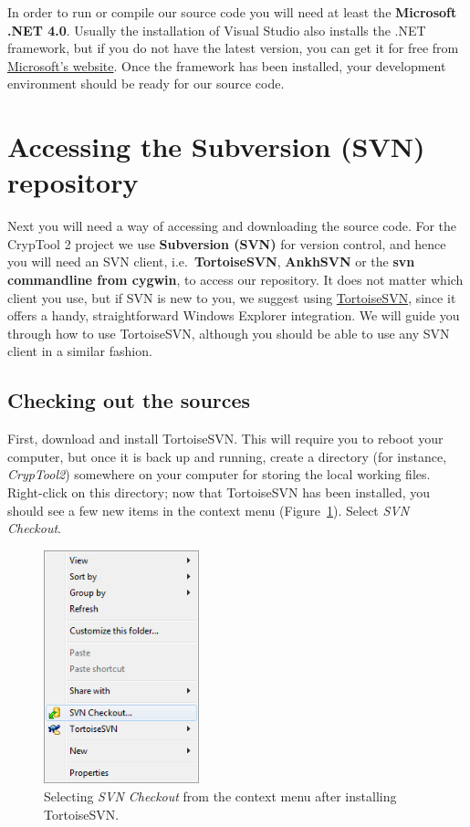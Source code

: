 In order to run or compile our source code you will need at least the \textbf{Microsoft .NET 4.0}. Usually the installation of Visual Studio also installs the .NET framework, but if you do not have the latest version, you can get it for free from \href{http://www.microsoft.com/downloads/details.aspx?FamilyID=9cfb2d51-5ff4-4491-b0e5-b386f32c0992}{Microsoft's website}. Once the framework has been installed, your development environment should be ready for our source code.
\clearpage

\section{Accessing the Subversion (SVN) repository}
\label{AccessingSubversion}

Next you will need a way of accessing and downloading the source code. For the CrypTool 2 project we use \textbf{Subversion (SVN)} for version control, and hence you will need an SVN client, i.e.\ \textbf{TortoiseSVN}, \textbf{AnkhSVN} or the \textbf{svn commandline from cygwin}, to access our repository. It does not matter which client you use, but if SVN is new to you, we suggest using \href{http://www.tortoisesvn.net/}{TortoiseSVN}, since it offers a handy, straightforward Windows Explorer integration. We will guide you through how to use TortoiseSVN, although you should be able to use any SVN client in a similar fashion.

\subsection{Checking out the sources}
\label{CheckingOutTheSources}

First, download and install TortoiseSVN. This will require you to reboot your computer, but once it is back up and running, create a directory (for instance, \textit{CrypTool2}) somewhere on your computer for storing the local working files. Right-click on this directory; now that TortoiseSVN has been installed, you should see a few new items in the context menu (Figure~\ref{fig:tortoise_svn_checkout}). Select \textit{SVN Checkout}.

\begin{figure}[h!]
	\centering
		\includegraphics[width=0.40\textwidth]{figures/tortoise_svn_checkout.png}
	\caption{Selecting \textit{SVN Checkout} from the context menu after installing TortoiseSVN.}
	\label{fig:tortoise_svn_checkout}
\end{figure}
\clearpage

